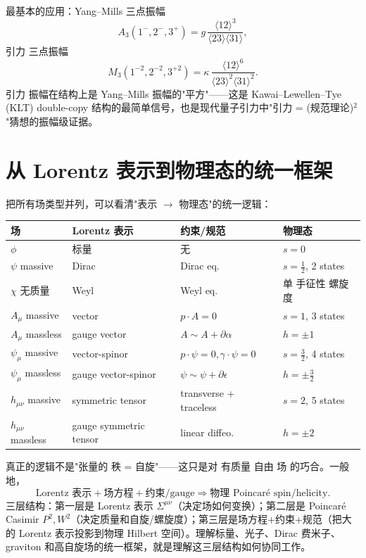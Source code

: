 最基本的应用：Yang--Mills 三点振幅
\begin{equation}
A_3(1^-,2^-,3^+)=g\,\frac{\langle 12\rangle^3}{\langle 23\rangle\langle 31\rangle},
\end{equation}
引力 三点振幅
\begin{equation}
M_3(1^{-2},2^{-2},3^{+2})=\kappa\,\frac{\langle 12\rangle^6}{\langle 23\rangle^2\langle 31\rangle^2}.
\end{equation}
引力 振幅在结构上是 Yang--Mills 振幅的"平方"——这是 Kawai--Lewellen--Tye (KLT) double-copy 结构的最简单信号，也是现代量子引力中"引力 = (规范理论)$^2$"猜想的振幅级证据。

\section{从 Lorentz 表示到物理态的统一框架}

把所有场类型并列，可以看清"表示 $\to$ 物理态"的统一逻辑：

\begin{center}
\begin{tabular}{llll}
\hline
场 & Lorentz 表示 & 约束/规范 & 物理态 \\
\hline
$\phi$ & 标量 & 无 & $s=0$ \\
$\psi$ massive & Dirac & Dirac eq. & $s=\frac{1}{2}$, 2 states \\
$\chi$ 无质量 & Weyl & Weyl eq. & 单 手征性 螺旋度 \\
$A_\mu$ massive & vector & $p\cdot A=0$ & $s=1$, 3 states \\
$A_\mu$ massless & gauge vector & $A\sim A+\partial\alpha$ & $h=\pm 1$ \\
$\psi_\mu$ massive & vector-spinor & $p\cdot\psi=0,\gamma\cdot\psi=0$ & $s=\frac{3}{2}$, 4 states \\
$\psi_\mu$ massless & gauge vector-spinor & $\psi\sim\psi+\partial\epsilon$ & $h=\pm\frac{3}{2}$ \\
$h_{\mu\nu}$ massive & symmetric tensor & transverse + traceless & $s=2$, 5 states \\
$h_{\mu\nu}$ massless & gauge symmetric tensor & linear diffeo. & $h=\pm 2$ \\
\hline
\end{tabular}
\end{center}

真正的逻辑不是"张量的 秩 = 自旋"——这只是对 有质量 自由 场 的巧合。一般地，
\begin{equation*}\boxed{
\text{Lorentz 表示}+\text{场方程}+\text{约束/gauge}\Longrightarrow\text{物理 Poincaré spin/helicity}.
}
\end{equation*}
三层结构：第一层是 Lorentz 表示 $\Sigma^{\mu\nu}$（决定场如何变换）；第二层是 Poincaré Casimir $P^2,W^2$（决定质量和自旋/螺旋度）；第三层是场方程+约束+规范（把大的 Lorentz 表示投影到物理 Hilbert 空间）。理解标量、光子、Dirac 费米子、graviton 和高自旋场的统一框架，就是理解这三层结构如何协同工作。

